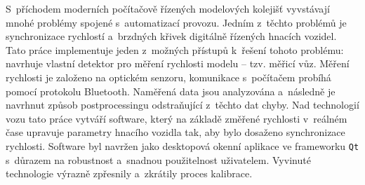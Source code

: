 S~příchodem moderních počítačově řízených modelových kolejišť vyvstávají mnohé
problémy spojené s~automatizací provozu. Jedním z~těchto problémů je
synchronizace rychlostí a~brzdných křivek digitálně řízených hnacích vozidel.
Tato práce implementuje jeden z~možných přístupů k~řešení tohoto problému:
navrhuje vlastní detektor pro měření rychlosti modelu -- tzv. měřicí vůz.
Měření rychlosti je založeno na optickém senzoru, komunikace s~počítačem
probíhá pomocí protokolu Bluetooth. Naměřená data jsou analyzována a~následně
je navrhnut způsob postprocessingu odstraňující z~těchto dat chyby.
Nad technologií vozu tato práce vytváří software, který na základě změřené
rychlosti v~reálném čase upravuje parametry hnacího vozidla tak, aby bylo
dosaženo synchronizace rychlosti. Software byl navržen jako desktopová okenní
aplikace ve frameworku \texttt{Qt} s~důrazem na robustnost a~snadnou
použitelnost uživatelem. Vyvinuté technologie výrazně zpřesnily a~zkrátily
proces kalibrace.
